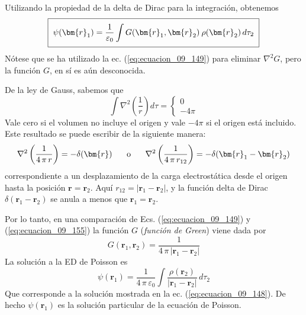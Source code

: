 Utilizando la propiedad de la delta de Dirac para la integración, obtenemos
\begin{equation}
\setlength{\fboxsep}{2\fboxsep}\boxed{\psi(\bm{r}_{1}) = \dfrac{1}{\varepsilon_{0}} \int G(\bm{r}_{1}, \bm{r}_{2}) \: \rho (\bm{r}_{2}) \, d \tau_{2} }
\label{eq:ecuacion_09_153}
\end{equation}
Nótese que se ha utilizado la ec. (\ref{eq:ecuacion_09_149}) para eliminar $\nabla^{2} G$, pero la función $G$, en sí es aún desconocida.
\par
De la ley de Gauss, sabemos que
\begin{equation}
\int \nabla^{2} \left( \dfrac{1}{r} \right) d \tau =
\begin{cases}
0 \\
- 4 \pi
\end{cases}
\label{eq:ecuacion_09_154}
\end{equation}
Vale cero si el volumen no incluye el origen y vale $-4 \pi$ si el origen está incluido. Este resultado se puede escribir de la siguiente manera:
\begin{equation}
\nabla^{2} \left( \dfrac{1}{4 \, \pi \, r} \right) = - \delta (\bm{r}) \hspace{0.5cm} \mbox{ o } \hspace{0.5cm} \nabla^{2} \left( \dfrac{1}{4 \, \pi \, r_{12}} \right) = - \delta (\bm{r}_{1} - \bm{r}_{2})
\label{eq:ecuacion_09_155}
\end{equation}
correspondiente a un desplazamiento de la carga electrostática desde el origen hasta la posición $\bm{r} = \bm{r}_{2}$. Aquí $r_{12} = \vert \bm{r}_{1} - \bm{r}_{2} \vert$, y la función delta de Dirac $\delta (\bm{r}_{1} - \bm{r}_{2})$ se anula a menos que $\bm{r}_{1} = \bm{r}_{2}$. 
\par
Por lo tanto, en una comparación de Ecs. (\ref{eq:ecuacion_09_149}) y (\ref{eq:ecuacion_09_155}) la función $G$ (\emph{función de Green}) viene dada por
\begin{equation}
G (\bm{r}_{1} , \bm{r}_{2}) = \dfrac{1}{4 \, \pi \, \vert \bm{r}_{1} - \bm{r}_{2} \vert}
\label{eq:ecuacion_09_156}
\end{equation}
La solución a la ED de Poisson es
\begin{equation}
\psi (\bm{r}_{1}) = \dfrac{1}{4 \, \pi \, \varepsilon_{0}} \int \dfrac{\rho (\bm{r}_{2})}{\vert \bm{r}_{1} - \bm{r}_{2} \vert} \, d \tau_{2}
\label{eq:ecuacion_09_157}
\end{equation}
Que corresponde a la solución mostrada en la ec. (\ref{eq:ecuacion_09_148}). De hecho $\psi (\bm{r}_{1})$ es la solución particular de la ecuación de Poisson.
